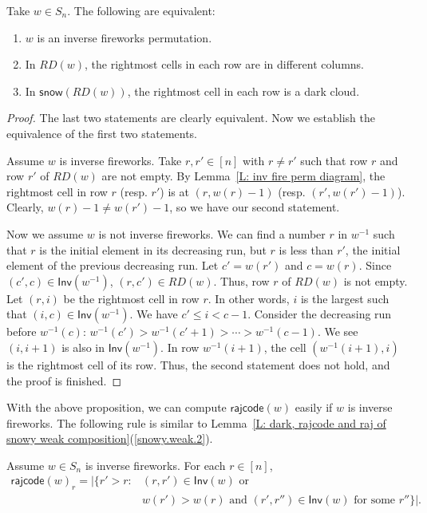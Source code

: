 \documentclass[ALCO]{cedram}
\newcommand{\snow}{\mathsf{snow}}
\newcommand{\rajcode}{\mathsf{rajcode}}
\newcommand{\Inv}{\mathsf{Inv}}
\begin{document}
\begin{prop}
Take $w \in S_n$.
The following are equivalent:
\begin{enumerate}
\item $w$ is an inverse fireworks permutation.
\item In $RD(w)$, the rightmost cells in each row 
are in different columns. 
\item In $\snow(RD(w))$, 
the rightmost cell in each row is a dark cloud. 
\end{enumerate}
\end{prop}
\begin{proof}
The last two statements are clearly equivalent. 
Now we establish the equivalence of 
the first two statements.

Assume $w$ is inverse fireworks.
Take $r, r' \in [n]$ with $r \neq r'$
such that row $r$ and row $r'$ of $RD(w)$
are not empty.
By Lemma~\ref{L: inv fire perm diagram},
the rightmost cell in row $r$ 
(resp. $r'$)
is at $(r, w(r) - 1)$ 
(resp. $(r', w(r') - 1)$).
Clearly, $w(r) - 1 \neq w(r') - 1$,
so we have our second statement. 

Now we assume $w$ is not inverse fireworks.
We can find a number $r$ in $w^{-1}$
such that $r$ is the initial element in
its decreasing run, 
but $r$ is less than $r'$, 
the initial element of the 
previous decreasing run. 
Let $c' = w(r')$ and $c = w(r)$.
Since $(c', c) \in \Inv(w^{-1})$, 
$(r, c') \in RD(w)$.
Thus, row $r$ of $RD(w)$ is not empty.
Let $(r, i)$ be the rightmost cell
in row $r$.
In other words, $i$ is the largest
such that $(i, c) \in \Inv(w^{-1})$.
We have $c' \leqslant i < c - 1$.
Consider the decreasing run before $w^{-1}(c)$:
$w^{-1}(c') > w^{-1}(c' + 1) > \cdots > w^{-1}(c - 1)$.
We see $(i, i+1)$ is also in $\Inv(w^{-1})$.
In row $w^{-1}(i+1)$, 
the cell $(w^{-1}(i+1), i)$ is the 
rightmost cell of its row.
Thus, the second statement does not hold,
and the proof is finished. 
\end{proof}

With the above proposition, we can compute $\rajcode(w)$ easily
if $w$ is inverse fireworks.
The following rule is similar to Lemma~\ref{L: dark, rajcode and raj of snowy weak composition}(\ref{snowy.weak.2}).

\begin{prop}
Assume $w \in S_n$ is inverse fireworks.
For each $r \in [n]$,
\begin{align*}
\rajcode(w)_r = |\{r' > r: &(r,r') \in \Inv(w) \textrm{ or }\\
&w(r') > w(r)\textrm{ and }(r', r'') \in \Inv(w) \textrm{ for some } r''\}|.
\end{align*}
\end{prop}
\end{document}
